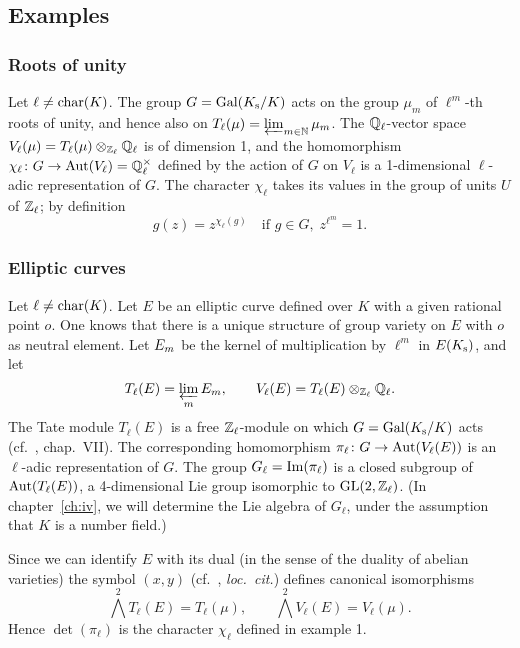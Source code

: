 \subsection{Examples}\label{sec:I_12}
\subsubsection{Roots of unity}\label{sec:I_121}
Let $\ell \ne \operatorname{char}(K)$. The group $G = \operatorname{Gal}(K_{\mathrm{s}} / K)$ acts on the group
$\mu_m$ of $\ell^m$-th roots of unity, and hence also on $T_\ell(\mu) =
\varprojlim_{m\in\mathbb{N}} \mu_m$.
The $\mathbb{Q}_\ell$-vector space $V_\ell(\mu) = T_\ell(\mu) \otimes_{\mathbb{Z}_\ell} \mathbb{Q}_\ell$
is of dimension 1, and the homomorphism $\chi_\ell \colon G \to \operatorname{Aut}(V_\ell) =
\mathbb{Q}_\ell^\times$ defined by the action of $G$ on $V_\ell$ is a 1-dimensional
$\ell$-adic representation of $G$. The character $\chi_\ell$ takes its values in
the group of units $U$ of $\mathbb{Z}_\ell$; by definition
$$ g(z) = z^{\chi_\ell(g)} \quad \text{if } g \in G, \; z^{\ell^m} = 1. $$

\subsubsection{Elliptic curves}\label{sec:I_122}
Let $\ell \ne \operatorname{char}(K)$. Let $E$ be an elliptic
curve defined over $K$ with a given rational point $o$. One knows that
\dpage
there is a unique structure of group variety on $E$ with $o$ as neutral
element. Let ${E}_{m}$ be the kernel of multiplication by $\ell^m$ in
$E(K_{\mathrm{s}})$, and let
\[
	T_\ell(E) = \varprojlim_m {E}_{m}, \qquad V_\ell(E) = T_\ell(E)
	\otimes_{\mathbb{Z}_\ell} \mathbb{Q}_\ell.
\]
The Tate module $T_\ell(E)$ is a free $\mathbb{Z}_\ell$-module on which $G =
\operatorname{Gal}(K_{\mathrm{s}} / K)$ acts (cf.\ \cite{12}, chap.\ VII). The corresponding
homomorphism $\pi_\ell \colon G \to \operatorname{Aut}(V_\ell(E))$ is an $\ell$-adic
representation of $G$. The group $G_\ell = \operatorname{Im}(\pi_\ell)$ is a closed
subgroup of $\operatorname{Aut}(T_\ell(E))$, a 4-dimensional Lie group isomorphic to $\operatorname{GL}(2,
\mathbb{Z}_\ell)$. (In chapter~\ref{ch:iv}, we will determine the Lie algebra of
$G_\ell$, under the assumption that $K$ is a number field.)

Since we can identify $E$ with its dual (in the sense of the duality of abelian
varieties) the symbol $(x,y)$ (cf.\ \cite{12}, \textit{loc.\ cit.}) defines
canonical isomorphisms
\[
	\textstyle\bigwedge^2 T_\ell(E) = T_\ell(\mu), \qquad
	\bigwedge^2 V_\ell(E) = V_\ell(\mu).
\]
Hence $\det(\pi_\ell)$ is the character $\chi_\ell$ defined in example 1.

